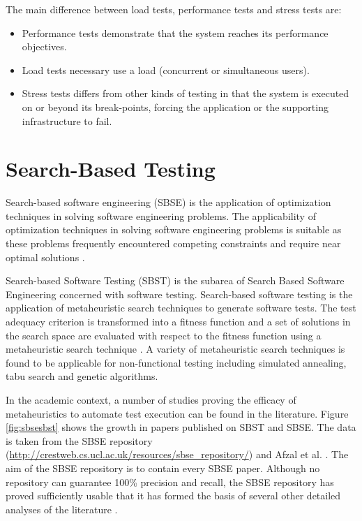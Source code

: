 \documentclass[espaco=umemeio,chapter=TITLE,twoside,openright]{abnt}
\begin{document}
The main difference between load tests, performance tests and stress tests are:

\begin{itemize}

\item Performance tests demonstrate that the system reaches its performance objectives.
\item Load tests necessary use a load (concurrent or simultaneous users).
\item Stress tests differs from other kinds of testing in that the system is executed on or beyond its break-points, forcing the application or the supporting infrastructure to fail.
\end{itemize}


\section{Search-Based Testing}

Search-based software engineering (SBSE) is the application of optimization techniques in solving software engineering problems. The applicability of optimization techniques in solving software engineering problems is suitable as these problems frequently encountered competing constraints and require near optimal solutions \cite{Afzal2009a} \cite{Harman2015}.


Search-based Software Testing (SBST) is the subarea of Search Based Software Engineering concerned with software testing. Search-based software testing is the application of metaheuristic search techniques to generate software tests. The test adequacy criterion is transformed into a fitness function and a set of solutions in the search space are evaluated with respect to the fitness function using a metaheuristic search technique \cite{Afzal2009a} \cite{Aleti2016} \cite{Harman2015}. A variety of metaheuristic search techniques is found to be applicable for non-functional testing including simulated annealing, tabu search and genetic algorithms.

In the academic context, a number of studies proving the efficacy of metaheuristics to automate test execution can be found in the literature. Figure \ref{fig:sbsesbst}  shows the growth in papers published on SBST and SBSE. The data is taken from the SBSE repository (\url{http://crestweb.cs.ucl.ac.uk/resources/sbse_repository/}) and Afzal et al. \cite{Afzal2009a} \cite{Harman2015}.
The aim of the SBSE repository is to contain every SBSE paper. Although no repository can guarantee 100\% precision and recall, the SBSE repository has proved sufficiently usable that it has formed the basis of several other detailed analyses of the literature \cite{Harman2015}.
\end{document}
